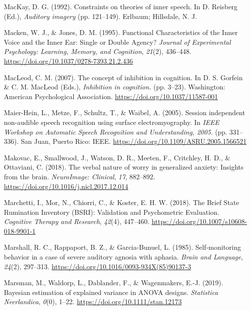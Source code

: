 \documentclass[a4paper,12pt,twoside,openright,oldfontcommands,final]{memoir}
\begin{document}
\leavevmode\hypertarget{ref-mackay_constraints_1992}{}%
MacKay, D. G. (1992). Constraints on theories of inner speech. In D. Reisberg (Ed.), \emph{Auditory imagery} (pp. 121--149). Erlbaum; Hillsdale, N. J.

\leavevmode\hypertarget{ref-macken_functional_1995}{}%
Macken, W. J., \& Jones, D. M. (1995). Functional Characteristics of the Inner Voice and the Inner Ear: Single or Double Agency? \emph{Journal of Experimental Psychology: Learning, Memory, and Cognition}, \emph{21}(2), 436--448. \url{https://doi.org/10.1037/0278-7393.21.2.436}

\leavevmode\hypertarget{ref-gorfein_concept_2007}{}%
MacLeod, C. M. (2007). The concept of inhibition in cognition. In D. S. Gorfein \& C. M. MacLeod (Eds.), \emph{Inhibition in cognition.} (pp. 3--23). Washington: American Psychological Association. \url{https://doi.org/10.1037/11587-001}

\leavevmode\hypertarget{ref-maier-hein_session_2005}{}%
Maier-Hein, L., Metze, F., Schultz, T., \& Waibel, A. (2005). Session independent non-audible speech recognition using surface electromyography. In \emph{IEEE Workshop on Automatic Speech Recognition and Understanding, 2005.} (pp. 331--336). San Juan, Puerto Rico: IEEE. \url{https://doi.org/10.1109/ASRU.2005.1566521}

\leavevmode\hypertarget{ref-makovac_verbal_2018}{}%
Makovac, E., Smallwood, J., Watson, D. R., Meeten, F., Critchley, H. D., \& Ottaviani, C. (2018). The verbal nature of worry in generalized anxiety: Insights from the brain. \emph{NeuroImage: Clinical}, \emph{17}, 882--892. \url{https://doi.org/10.1016/j.nicl.2017.12.014}

\leavevmode\hypertarget{ref-marchetti_brief_2018}{}%
Marchetti, I., Mor, N., Chiorri, C., \& Koster, E. H. W. (2018). The Brief State Rumination Inventory (BSRI): Validation and Psychometric Evaluation. \emph{Cognitive Therapy and Research}, \emph{42}(4), 447--460. \url{https://doi.org/10.1007/s10608-018-9901-1}

\leavevmode\hypertarget{ref-marshall_self-monitoring_1985}{}%
Marshall, R. C., Rappaport, B. Z., \& Garcia-Bunuel, L. (1985). Self-monitoring behavior in a case of severe auditory agnosia with aphasia. \emph{Brain and Language}, \emph{24}(2), 297--313. \url{https://doi.org/10.1016/0093-934X(85)90137-3}

\leavevmode\hypertarget{ref-marsman_bayesian_2019}{}%
Marsman, M., Waldorp, L., Dablander, F., \& Wagenmakers, E.-J. (2019). Bayesian estimation of explained variance in ANOVA designs. \emph{Statistica Neerlandica}, \emph{0}(0), 1--22. \url{https://doi.org/10.1111/stan.12173}
\end{document}

